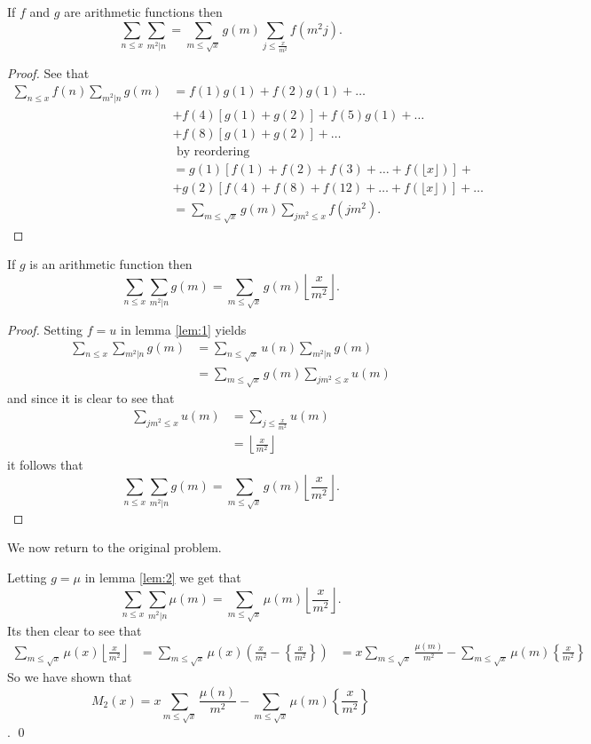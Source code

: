 \documentclass{unswmaths}
\begin{document}
\begin{lemma}
\label{lem:1}
If $ f $ and $ g $ are arithmetic functions then
$$
	\sum_{n\leq x} \sum_{m^2 |n} = \sum_{m\leq \sqrt{x}} g(m) \sum_{j \leq \frac{x}{m^2}} f(m^2j).
$$
\end{lemma}
\begin{proof}
	See that
	\begin{align*}
		\sum_{n\leq x}f(n) \sum_{m^2|n} g(m) &= f(1)g(1) + f(2)g(1) + \ldots \\
		&+ f(4)[ g(1) + g(2)] + f(5)g(1) + \ldots \\  
		&+ f(8)[g(1) + g(2)] + \ldots \\
			&\text{ by reordering } \\
			&= g(1)[ f(1) + f(2) + f(3) + \ldots + f(\lfloor x \rfloor ) ] + \\
				&+ g(2)[ f(4) + f(8) + f(12) + \ldots + f(\lfloor x \rfloor ) ] + \ldots \\
			&= \sum_{m \leq \sqrt{x}} g(m) \sum_{jm^2 \leq x}f(jm^2).
	\end{align*}
\end{proof}

\begin{lemma}
	\label{lem:2}
	If $ g $ is an arithmetic function then 
	$$
 		\sum_{n\leq x} \sum_{m^2|n} g(m) = \sum_{m\leq \sqrt{x}} g(m) \left\lfloor \frac{x}{m^2} \right\rfloor.
	$$
\end{lemma}
\begin{proof}	
	Setting $ f = u $ in lemma \ref{lem:1} yields
	\begin{align*}
		\sum_{n \leq x} \sum_{m^2|n} g(m) &= \sum_{n\leq \sqrt{x}} u(n) \sum_{m^2|n} g(m) \\
			&= \sum_{m \leq \sqrt{x}} g(m) \sum_{jm^2 \leq x} u(m)
	\end{align*}
	and since it is clear to see that 
	\begin{align*}
		\sum_{jm^2 \leq x} u(m) &= \sum_{j \leq \frac{x}{m^2}} u(m)  \\
			&= \left\lfloor \frac{x}{m^2} \right\rfloor 
	\end{align*}
	it follows that 
	$$
		\sum_{n\leq x} \sum_{m^2|n} g(m) = \sum_{m\leq \sqrt{x}} g(m) \left\lfloor \frac{x}{m^2} \right\rfloor.
	$$
\end{proof}

We now return to the original problem.

Letting $ g = \mu $ in lemma \ref{lem:2} we get that 
$$
	\sum_{n\leq x} \sum_{m^2 | n} \mu(m) = \sum_{m \leq{\sqrt{x}}} \mu(m) \left\lfloor \frac{x}{m^2} \right\rfloor.
$$
Its then clear to see that
\begin{align*}
	\sum_{m\leq \sqrt{x}} \mu(x) \left\lfloor \frac{x}{m^2} \right\rfloor &= \sum_{m \leq \sqrt{x}} \mu(x) \left( \frac{x}{m^2} - \left\{ \frac{x}{m^2} \right\} \right)
		&= x \sum_{m \leq \sqrt{x}} \frac{\mu(m)}{m^2} - \sum_{m \leq \sqrt{x}} \mu(m) \left\{ \frac{x}{m^2} \right\}
\end{align*}
So we have shown that
$$ M_2(x) = x \sum_{m \leq \sqrt{x}} \frac{\mu(n)}{m^2} - \sum_{m \leq \sqrt{x}} \mu(m) \left\{ \frac{x}{m^2} \right\} $$. \qed
\end{document}
